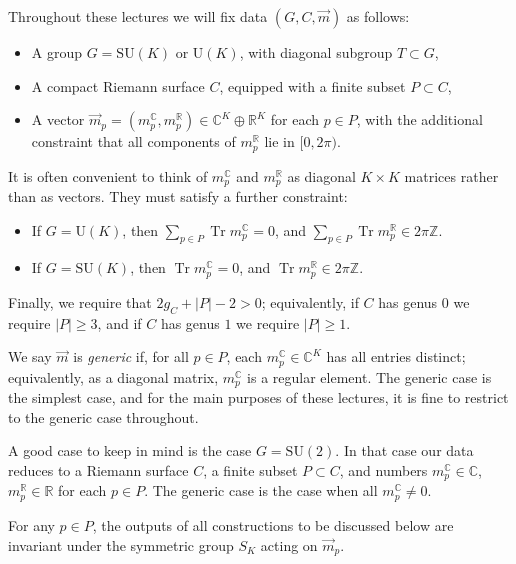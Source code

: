 \documentclass[12pt,letterpaper,reqno]{article}
\numberwithin{equation}{section}
\newcommand{\R}{\ensuremath{\mathbb R}}
\newcommand{\C}{\ensuremath{\mathbb C}}
\newcommand{\Z}{\ensuremath{\mathbb Z}}
\newcommand{\abs}[1]{\lvert#1\rvert}
\newcommand{\ti}[1]{\textit{#1}}
\DeclareMathOperator{\Tr}{Tr}
\newcommand{\SU}{\mathrm{SU}}
\newcommand{\U}{\mathrm{U}}
\newcommand{\insfig}[2]{

\medskip
\noindent
\begin{minipage}{\linewidth}

\makebox[\linewidth]{\texttt{[image: figures/\#1-crop.pdf]}}

\end{minipage}
\medskip

}
\begin{document}
Throughout these lectures we will fix data $(G,C,\vec m)$ as follows:
\begin{itemize}
  \item A group $G = \SU(K)$ or $\U(K)$, with diagonal subgroup $T \subset G$,
  \item A compact Riemann surface $C$, equipped with a finite subset $P \subset C$,
  \item A vector $\vec{m}_p = (m^\C_p, m^\R_p) \in \C^K \oplus \R^K$ for each $p \in P$, with the additional constraint that all components of $m_p^\R$ lie in $[0,2\pi)$.
\end{itemize}
It is often convenient to think of $m_p^\C$ and $m_p^\R$ as diagonal
$K \times K$ matrices rather than as vectors. They must satisfy 
a further constraint:
\begin{itemize}
\item If $G = \U(K)$, then 
$\sum_{p \in P} \Tr m_p^\C = 0$, and
$\sum_{p \in P} \Tr m_p^\R \in 2 \pi \Z$.
\item If $G = \SU(K)$, then
$\Tr m_p^\C = 0$, and $\Tr m_p^\R \in 2 \pi \Z$.
\end{itemize}
Finally, we require that $2g_C + \abs{P} - 2 > 0$; equivalently, 
if $C$ has genus $0$ we require $\abs{P} \ge 3$, 
and if $C$ has genus $1$ we require $\abs{P} \ge 1$.
\insfig{higgs-metric-1}{0.8}

\begin{defn}
We say $\vec{m}$ is \ti{generic} if,
for all $p \in P$, each $m^\C_p \in \C^K$
has all entries distinct; equivalently, as a diagonal
matrix, $m^\C_p$ is a regular element.
The generic case is the simplest
case, and for the main purposes of these lectures,
it is fine to restrict to the generic case throughout.
\end{defn}

\begin{example}[The case of $G = \SU(2)$]
A good case to keep in mind is the case $G = \SU(2)$. In that case our data reduces to a Riemann surface $C$, a finite subset $P \subset C$,
and numbers $m^\C_p \in \C$, $m^\R_p \in \R$ for each $p \in P$. The generic case is the case when all $m^\C_p \neq 0$.
\end{example}

\begin{remark} For any $p \in P$, the outputs of all constructions to
be discussed below are invariant under the symmetric group $S_K$ 
acting on $\vec m_p$.
\end{remark}
\end{document}
